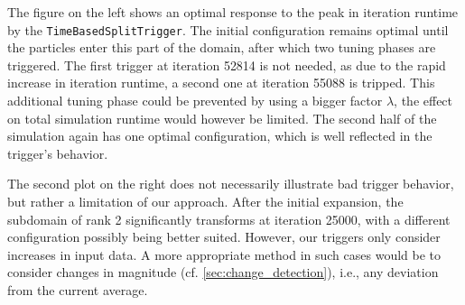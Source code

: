 The figure on the left shows an optimal response to the peak in iteration runtime by the \texttt{TimeBasedSplitTrigger}. The initial configuration remains optimal until the particles enter this part of the domain, after which two tuning phases are triggered. The first trigger at iteration \num{52814} is not needed, as due to the rapid increase in iteration runtime, a second one at iteration \num{55088} is tripped. This additional tuning phase could be prevented by using a bigger factor $\lambda$, the effect on total simulation runtime would however be limited. The second half of the simulation again has one optimal configuration, which is well reflected in the trigger's behavior.

The second plot on the right does not necessarily illustrate bad trigger behavior, but rather a limitation of our approach. After the initial expansion, the subdomain of rank 2 significantly transforms at iteration \num{25000}, with a different configuration possibly being better suited. However, our triggers only consider increases in input data. A more appropriate method in such cases would be to consider changes in magnitude (cf. \autoref{sec:change_detection}), i.e., any deviation from the current average.



